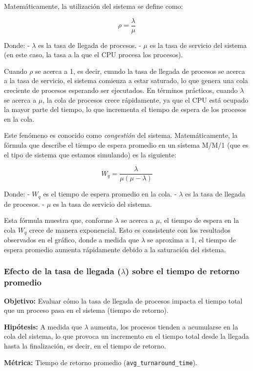 \documentclass[12pt]{article}
\begin{document}
Matemáticamente, la utilización del sistema se define como:

\[
\rho = \frac{\lambda}{\mu}
\]

Donde:
- \(\lambda\) es la tasa de llegada de procesos.
- \(\mu\) es la tasa de servicio del sistema (en este caso, la tasa a la que el CPU procesa los procesos).

Cuando \(\rho\) se acerca a 1, es decir, cuando la tasa de llegada de procesos se acerca a la tasa de servicio, el sistema comienza a estar saturado, lo que genera una cola creciente de procesos esperando ser ejecutados. En términos prácticos, cuando \(\lambda\) se acerca a \(\mu\), la cola de procesos crece rápidamente, ya que el CPU está ocupado la mayor parte del tiempo, lo que incrementa el tiempo de espera de los procesos en la cola.

Este fenómeno es conocido como \textit{congestión} del sistema. Matemáticamente, la fórmula que describe el tiempo de espera promedio en un sistema M/M/1 (que es el tipo de sistema que estamos simulando) es la siguiente:

\[
W_q = \frac{\lambda}{\mu(\mu - \lambda)}
\]

Donde:
- \(W_q\) es el tiempo de espera promedio en la cola.
- \(\lambda\) es la tasa de llegada de procesos.
- \(\mu\) es la tasa de servicio del sistema.

Esta fórmula muestra que, conforme \(\lambda\) se acerca a \(\mu\), el tiempo de espera en la cola \(W_q\) crece de manera exponencial. Esto es consistente con los resultados observados en el gráfico, donde a medida que \(\lambda\) se aproxima a 1, el tiempo de espera promedio aumenta rápidamente debido a la saturación del sistema.


\subsubsection*{Efecto de la tasa de llegada (\(\lambda\)) sobre el tiempo de retorno promedio}

\textbf{Objetivo:} Evaluar cómo la tasa de llegada de procesos impacta el tiempo total que un proceso pasa en el sistema (tiempo de retorno).

\textbf{Hipótesis:} A medida que \(\lambda\) aumenta, los procesos tienden a acumularse en la cola del sistema, lo que provoca un incremento en el tiempo total desde la llegada hasta la finalización, es decir, en el tiempo de retorno.

\textbf{Métrica:} Tiempo de retorno promedio (\texttt{avg\_turnaround\_time}).
\end{document}
